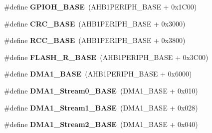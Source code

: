 \begin{DoxyCompactItemize}
\item 
\#define {\bfseries G\+P\+I\+O\+H\+\_\+\+B\+A\+SE}~(A\+H\+B1\+P\+E\+R\+I\+P\+H\+\_\+\+B\+A\+SE + 0x1\+C00)\hypertarget{group___peripheral__memory__map_gaee4716389f3a1c727495375b76645608}{}\label{group___peripheral__memory__map_gaee4716389f3a1c727495375b76645608}

\item 
\#define {\bfseries C\+R\+C\+\_\+\+B\+A\+SE}~(A\+H\+B1\+P\+E\+R\+I\+P\+H\+\_\+\+B\+A\+SE + 0x3000)\hypertarget{group___peripheral__memory__map_ga656a447589e785594cbf2f45c835ad7e}{}\label{group___peripheral__memory__map_ga656a447589e785594cbf2f45c835ad7e}

\item 
\#define {\bfseries R\+C\+C\+\_\+\+B\+A\+SE}~(A\+H\+B1\+P\+E\+R\+I\+P\+H\+\_\+\+B\+A\+SE + 0x3800)\hypertarget{group___peripheral__memory__map_ga0e681b03f364532055d88f63fec0d99d}{}\label{group___peripheral__memory__map_ga0e681b03f364532055d88f63fec0d99d}

\item 
\#define {\bfseries F\+L\+A\+S\+H\+\_\+\+R\+\_\+\+B\+A\+SE}~(A\+H\+B1\+P\+E\+R\+I\+P\+H\+\_\+\+B\+A\+SE + 0x3\+C00)\hypertarget{group___peripheral__memory__map_ga8e21f4845015730c5731763169ec0e9b}{}\label{group___peripheral__memory__map_ga8e21f4845015730c5731763169ec0e9b}

\item 
\#define {\bfseries D\+M\+A1\+\_\+\+B\+A\+SE}~(A\+H\+B1\+P\+E\+R\+I\+P\+H\+\_\+\+B\+A\+SE + 0x6000)\hypertarget{group___peripheral__memory__map_gab2d8a917a0e4ea99a22ac6ebf279bc72}{}\label{group___peripheral__memory__map_gab2d8a917a0e4ea99a22ac6ebf279bc72}

\item 
\#define {\bfseries D\+M\+A1\+\_\+\+Stream0\+\_\+\+B\+A\+SE}~(D\+M\+A1\+\_\+\+B\+A\+SE + 0x010)\hypertarget{group___peripheral__memory__map_ga0d3c52aa35dcc68f78b704dfde57ba95}{}\label{group___peripheral__memory__map_ga0d3c52aa35dcc68f78b704dfde57ba95}

\item 
\#define {\bfseries D\+M\+A1\+\_\+\+Stream1\+\_\+\+B\+A\+SE}~(D\+M\+A1\+\_\+\+B\+A\+SE + 0x028)\hypertarget{group___peripheral__memory__map_ga5b4152cef577e37eccc9311d8bdbf3c2}{}\label{group___peripheral__memory__map_ga5b4152cef577e37eccc9311d8bdbf3c2}

\item 
\#define {\bfseries D\+M\+A1\+\_\+\+Stream2\+\_\+\+B\+A\+SE}~(D\+M\+A1\+\_\+\+B\+A\+SE + 0x040)\hypertarget{group___peripheral__memory__map_ga48a551ee91d3f07dd74347fdb35c703d}{}\label{group___peripheral__memory__map_ga48a551ee91d3f07dd74347fdb35c703d}


\end{DoxyCompactItemize}
